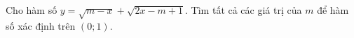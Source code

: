 \begin{ex}
Cho hàm số $y=\sqrt{m-x}+\sqrt{2x-m+1}$. Tìm tất cả các giá trị của $m$ để hàm số xác định trên $(0;1)$.
\end{ex}
